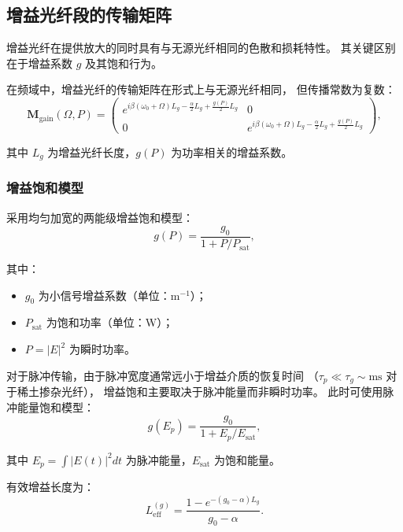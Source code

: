 \documentclass[11pt,a4paper]{ctexart}
\begin{document}
\subsection{增益光纤段的传输矩阵}

增益光纤在提供放大的同时具有与无源光纤相同的色散和损耗特性。
其关键区别在于增益系数 $g$ 及其饱和行为。

在频域中，增益光纤的传输矩阵在形式上与无源光纤相同，
但传播常数为复数：
\begin{equation}
  \mathbf{M}_{\text{gain}}(\Omega, P) =
  \begin{pmatrix}
    e^{i\beta(\omega_0+\Omega)L_g - \frac{\alpha}{2}L_g + \frac{g(P)}{2}L_g} & 0 \\[4pt]
    0 & e^{i\beta(\omega_0+\Omega)L_g - \frac{\alpha}{2}L_g + \frac{g(P)}{2}L_g}
  \end{pmatrix},
  \label{eq:M_gain}
\end{equation}

其中 $L_g$ 为增益光纤长度，$g(P)$ 为功率相关的增益系数。

\subsubsection{增益饱和模型}

采用均匀加宽的两能级增益饱和模型：
\begin{equation}
  g(P) = \frac{g_0}{1 + P / P_{\text{sat}}},
  \label{eq:gain_saturation}
\end{equation}

其中：
\begin{itemize}
  \item $g_0$ 为小信号增益系数（单位：m$^{-1}$）；
  \item $P_{\text{sat}}$ 为饱和功率（单位：W）；
  \item $P = |E|^2$ 为瞬时功率。
\end{itemize}

对于脉冲传输，由于脉冲宽度通常远小于增益介质的恢复时间
（$\tau_p \ll \tau_g \sim \text{ms}$ 对于稀土掺杂光纤），
增益饱和主要取决于脉冲能量而非瞬时功率\cite{agrawal2019nonlinear}。
此时可使用脉冲能量饱和模型：
\begin{equation}
  g(E_p) = \frac{g_0}{1 + E_p / E_{\text{sat}}},
  \label{eq:gain_energy_sat}
\end{equation}

其中 $E_p = \int |E(t)|^2 dt$ 为脉冲能量，$E_{\text{sat}}$ 为饱和能量。

有效增益长度为：
\begin{equation}
  L_{\text{eff}}^{(g)} = \frac{1 - e^{-(g_0 - \alpha)L_g}}{g_0 - \alpha}.
  \label{eq:Leff_gain}
\end{equation}
\end{document}
